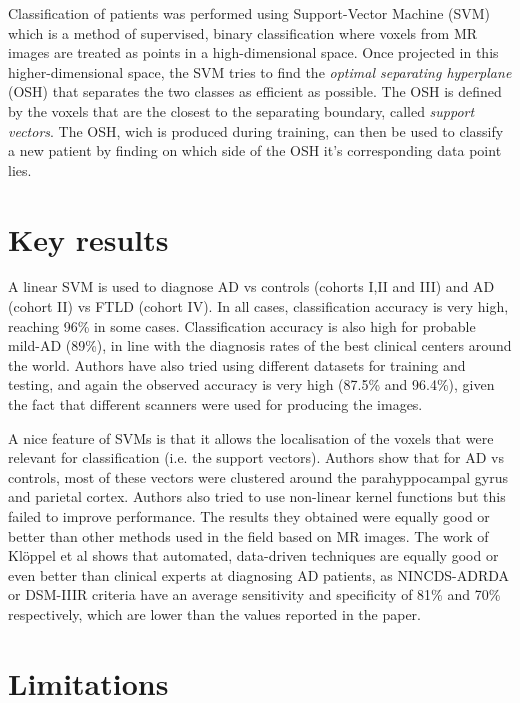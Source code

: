 \documentclass[11pt,a4paper,oneside]{report}
\begin{document}
Classification of patients was performed using Support-Vector Machine (SVM) which is a method of supervised, binary classification where voxels from MR images are treated as points in a high-dimensional space.  \cite{vapnik1998statistical,bishop2006pattern} Once projected in this higher-dimensional space, the SVM tries to find the \emph{optimal separating hyperplane} (OSH) that separates the two classes as efficient as possible. The OSH is defined by the voxels that are the closest to the separating boundary, called \emph{support vectors}. The OSH, wich is produced during training, can then be used to classify a new patient by finding on which side of the OSH it's corresponding data point lies. 

\section*{Key results}

A linear SVM is used to diagnose AD vs controls (cohorts I,II and III) and AD (cohort II) vs FTLD (cohort IV). In all cases, classification accuracy is very high, reaching 96\% in some cases. Classification accuracy is also high for probable mild-AD (89\%), in line with the diagnosis rates of the best clinical centers around the world. Authors have also tried using different datasets for training and testing, and again the observed accuracy is very high (87.5\% and 96.4\%), given the fact that different scanners were used for producing the images. 

A nice feature of SVMs is that it allows the localisation of the voxels that were relevant for classification (i.e. the support vectors). Authors show that for AD vs controls, most of these vectors were clustered around the parahyppocampal gyrus and parietal cortex. Authors also tried to use non-linear kernel functions but this failed to improve performance. The results they obtained were equally good or better than other methods used in the field based on MR images. \cite{gosche2002hippocampal,jack2002antemortem,barnes2004differentiating,csernansky2004correlations,wahlund2005evidence} The work of Kl\"{o}ppel et al \cite{kloppel2008automatic} shows that automated, data-driven techniques are equally good or even better than clinical experts at diagnosing AD patients, as NINCDS-ADRDA or DSM-IIIR criteria have an average sensitivity and specificity of 81\% and 70\% respectively, which are lower than the values reported in the paper. \cite{knopman2001practice} 

\section*{Limitations}
\end{document}
